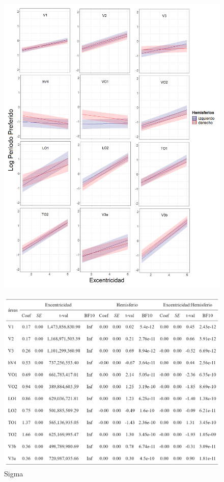 \begin{figure}
	\centering
	\includegraphics[scale=0.6]{Graphics/compuesto_rois_pp_vs_eccen_hem}
	\label{fig:pp_vs_eccen_hem}
\end{figure}

\begin{figure}
	\centering		
	\includegraphics[scale=0.8]{../images/table_sigma}
	\caption{Sigma}
\end{figure}

